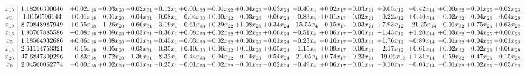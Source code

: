 \documentclass[9pt]{article}
\begin{document}
 \[\begin{array}{c| c c@{\hskip 2pt} c@{\hskip 2pt} c@{\hskip 2pt} c@{\hskip 2pt} c@{\hskip 2pt} c@{\hskip 2pt} c@{\hskip 2pt} c@{\hskip 2pt} c@{\hskip 2pt} c@{\hskip 2pt} c@{\hskip 2pt} c@{\hskip 2pt} c@{\hskip 2pt} c@{\hskip 2pt} c@{\hskip 2pt} c@{\hskip 2pt} }
 x_{10}   &  1.18266300046 & +  0.02 x_{18} & -0.03 x_{20} & -0.02 x_{31} & -0.12 x_{1} & +  0.00 x_{33} & -0.01 x_{22} & +  0.04 x_{26} & -0.03 x_{24} & +  0.40 x_{4} & +  0.02 x_{17} & -0.03 x_{21} & +  0.05 x_{12} & -0.42 x_{14} & +  0.00 x_{32} & -0.01 x_{25} & -0.02 x_{28}\\
 x_{3}   &  1.0150596144 & +  0.01 x_{18} & -0.01 x_{20} & -0.04 x_{31} & -0.08 x_{1} & -0.04 x_{33} & +  0.00 x_{22} & -0.03 x_{26} & -0.06 x_{24} & -0.83 x_{4} & +  0.01 x_{17} & +  0.02 x_{21} & -0.22 x_{12} & +  0.40 x_{14} & -0.02 x_{32} & -0.04 x_{25} & -0.04 x_{28}\\
 x_{19}   &  8.70848987949 & +  0.55 x_{18} & -1.26 x_{20} & -0.66 x_{31} & -3.19 x_{1} & -0.61 x_{33} & +  0.29 x_{22} & +  1.08 x_{26} & +  0.34 x_{24} & -15.55 x_{4} & -0.15 x_{17} & -0.03 x_{21} & +  7.93 x_{12} & -21.25 x_{14} & -0.01 x_{32} & +  0.75 x_{25} & +  0.63 x_{28}\\
 x_{16}   &  1.93767885586 & -0.08 x_{18} & +  0.09 x_{20} & +  0.03 x_{31} & -0.36 x_{1} & +  0.08 x_{33} & +  0.02 x_{22} & +  0.02 x_{26} & +  0.06 x_{24} & +  0.51 x_{4} & +  0.06 x_{17} & +  0.00 x_{21} & -1.43 x_{12} & +  1.20 x_{14} & +  0.03 x_{32} & -0.04 x_{25} & +  0.00 x_{28}\\
 x_{5}   &  1.18564932686 & +  0.06 x_{18} & -0.08 x_{20} & -0.01 x_{31} & +  0.45 x_{1} & -0.03 x_{33} & -0.02 x_{22} & +  0.00 x_{26} & -0.01 x_{24} & -0.23 x_{4} & -0.10 x_{17} & +  0.03 x_{21} & +  1.76 x_{12} & -0.89 x_{14} & -0.01 x_{32} & +  0.04 x_{25} & -0.01 x_{28}\\
 x_{13}   &  2.61114753321 & -0.15 x_{18} & -0.05 x_{20} & -0.03 x_{31} & +  0.35 x_{1} & +  0.10 x_{33} & +  0.06 x_{22} & +  0.10 x_{26} & +  0.05 x_{24} & -1.15 x_{4} & +  0.09 x_{17} & -0.06 x_{21} & -2.17 x_{12} & +  0.61 x_{14} & +  0.02 x_{32} & -0.02 x_{25} & +  0.06 x_{28}\\
 x_{23}   &  47.6847309296 & -0.83 x_{18} & -0.72 x_{20} & -1.36 x_{31} & -8.32 x_{1} & -0.44 x_{33} & -0.04 x_{22} & -0.14 x_{26} & -0.54 x_{24} & -21.05 x_{4} & +  0.74 x_{17} & -0.23 x_{21} & -19.06 x_{12} & +  1.31 x_{14} & -0.59 x_{32} & -0.47 x_{25} & -0.15 x_{28}\\
 x_{8}   &  2.04560062774 & -0.00 x_{18} & +  0.02 x_{20} & -0.01 x_{31} & -0.25 x_{1} & -0.01 x_{33} & -0.02 x_{22} & -0.01 x_{26} & -0.02 x_{24} & +  0.49 x_{4} & +  0.06 x_{17} & +  0.01 x_{21} & -0.10 x_{12} & -0.03 x_{14} & -0.01 x_{32} & +  0.02 x_{25} & -0.05 x_{28}\\

\end{array}\]
\end{document}

